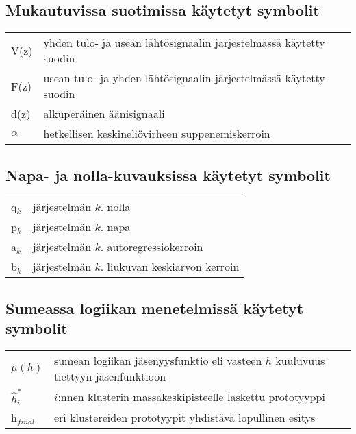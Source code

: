 \documentclass[finnish,12pt]{article}
\begin{document}
\subsection*{Mukautuvissa suotimissa käytetyt symbolit}

\begin{tabular}{p{2cm}p{12cm}}
V(z)					& yhden tulo- ja usean lähtösignaalin järjestelmässä käytetty suodin \\
F(z)					& usean tulo- ja yhden lähtösignaalin järjestelmässä käytetty suodin \\
d(z)					& alkuperäinen äänisignaali \\
$\alpha$				& hetkellisen keskineliövirheen suppenemiskerroin \\
\end{tabular}

\subsection*{Napa- ja nolla-kuvauksissa käytetyt symbolit}

\begin{tabular}{p{2cm}p{12cm}}
q$_k$					& järjestelmän $k$. nolla \\
p$_k$					& järjestelmän $k$. napa \\
a$_k$					& järjestelmän $k$. autoregressiokerroin \\
b$_k$					& järjestelmän $k$. liukuvan keskiarvon kerroin \\
\end{tabular}

\subsection*{Sumeassa logiikan menetelmissä käytetyt symbolit}

\begin{tabular}{p{2cm}p{12cm}}
$\mu(h)$				& sumean logiikan jäsenyysfunktio eli vasteen $h$ kuuluvuus tiettyyn jäsenfunktioon \\
$\hat{h}_i^*$			& $i$:nnen klusterin massakeskipisteelle laskettu prototyyppi \\
h$_{final}$				& eri klustereiden prototyypit yhdistävä lopullinen esitys \\
\end{tabular}

\end{document}
